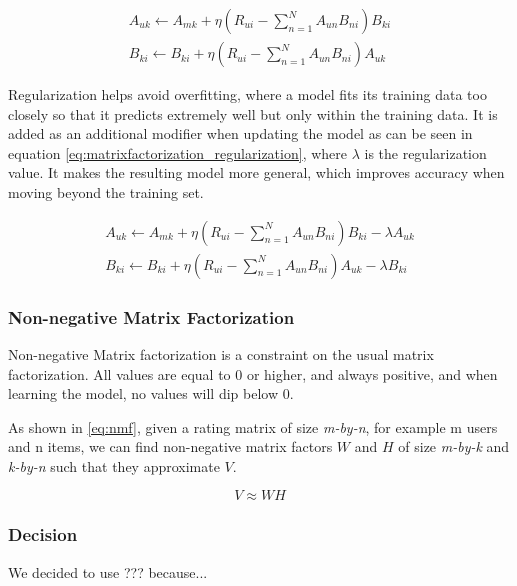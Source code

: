 \begin{equation}\label{eq:matrixfactorization_learningrate}
	\begin{split}
	A_{uk}\leftarrow A_{mk} + \eta(R_{ui}-\sum_{n=1}^{N}A_{un}B_{ni})B_{ki}
	\\
	B_{ki}\leftarrow B_{ki} + \eta(R_{ui}-\sum_{n=1}^{N}A_{un}B_{ni})A_{uk}
	\end{split}
\end{equation}

Regularization helps avoid overfitting, where a model fits its training data too closely so that it predicts extremely well but only within the training data. It is added as an additional modifier when updating the model as can be seen in equation \ref{eq:matrixfactorization_regularization}, where $\lambda$ is the regularization value. It makes the resulting model more general, which improves accuracy when moving beyond the training set.

\begin{equation}\label{eq:matrixfactorization_regularization}
	\begin{split}
	A_{uk}\leftarrow A_{mk} + \eta(R_{ui}-\sum_{n=1}^{N}A_{un}B_{ni})B_{ki}-\lambda A_{uk}
	\\
	B_{ki}\leftarrow B_{ki} + \eta(R_{ui}-\sum_{n=1}^{N}A_{un}B_{ni})A_{uk} -\lambda B_{ki}
	\end{split}
\end{equation}

\subsubsection{Non-negative Matrix Factorization}

Non-negative Matrix factorization is a constraint on the usual matrix factorization. All values are equal to 0 or higher, and always positive, and when learning the model, no values will dip below 0.

As shown in \ref{eq:nmf}, given a rating matrix of size \textit{m-by-n}, for example m users and n items, we can find non-negative matrix factors $W$ and $H$ of size \textit{m-by-k} and \textit{k-by-n} such that they approximate $V$.

\begin{equation} \label{eq:nmf}
	V \approx W H
\end{equation}

\subsubsection{Decision}\label{sec:decision} %
We decided to use ??? because...

